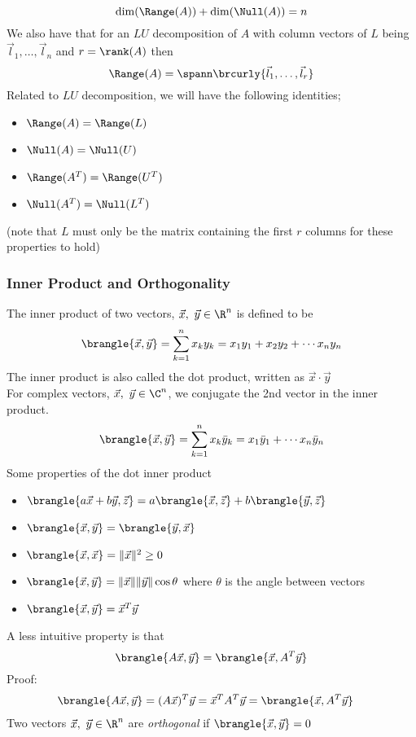 $$\dim(\Range(A))+\dim(\Null(A))=n$$
We also have that for an $LU$ decomposition of $A$ with column vectors of $L$ being $\vec{l}_1,\ldots,\vec{l}_n$ and $r=\rank(A)$ then
$$\Range(A)=\spann\brcurly{\vec{l}_1,\ldots,\vec{l}_r}$$
Related to $LU$ decomposition, we will have the following identities;
\begin{itemize}
    \item $\Range(A)=\Range(L)$
    \item $\Null(A)=\Null(U)$
    \item $\Range(A^T)=\Range(U^T)$
    \item $\Null(A^T)=\Null(L^T)$
\end{itemize}
(note that $L$ must only be the matrix containing the first $r$ columns for these properties to hold)

\subsubsection{Inner Product and Orthogonality}
The inner product of two vectors, $\vec{x},\ \vec{y}\in\R^n$ is defined to be
$$\brangle{\vec{x},\vec{y}}=\sum_{k=1}^nx_ky_k=x_1y_1+x_2y_2+\cdots x_ny_n$$
The inner product is also called the dot product, written as $\vec{x}\cdot\vec{y}$\\
For complex vectors, $\vec{x},\ \vec{y}\in \C^n$, we conjugate the 2nd vector in the inner product.
$$\brangle{\vec{x},\vec{y}}=\sum_{k=1}^nx_k\bar{y}_k=x_1\bar{y}_1+\cdots x_n\bar{y}_n$$
Some properties of the dot inner product
\begin{itemize}
    \item $\brangle{a\vec{x}+b\vec{y},\vec{z}}=a\brangle{\vec{x},\vec{z}}+b\brangle{\vec{y},\vec{z}}$
    \item $\brangle{\vec{x},\vec{y}}=\brangle{\vec{y},\vec{x}}$
    \item $\brangle{\vec{x},\vec{x}}=\|\vec{x}\|^2\geq0$
    \item $\brangle{\vec{x},\vec{y}}=\|\vec{x}\|\|\vec{y}\|\cos\theta$ where $\theta$ is the angle between vectors
    \item $\brangle{\vec{x},\vec{y}}=\vec{x}^T\vec{y}$
\end{itemize}
A less intuitive property is that
$$\brangle{A\vec{x},\vec{y}}=\brangle{\vec{x},A^T\vec{y}}$$
Proof:
\begin{align*}
    &\brangle{A\vec{x},\vec{y}}=(A\vec{x})^T\vec{y}=\vec{x}^TA^T\vec{y}=\brangle{\vec{x},A^T\vec{y}}
\end{align*}
Two vectors $\vec{x},\ \vec{y}\in\R^n$ are \textit{orthogonal} if $\brangle{\vec{x},\vec{y}}=0$\\
